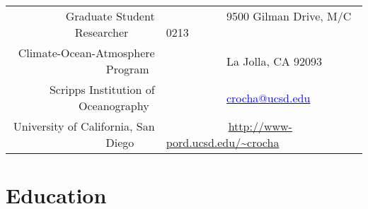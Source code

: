 \documentclass[pagestart=firstchapter]{article}
\begin{document}
\pagestyle{empty} %



\par{\bigskip\par} %

\begin{center}
    \begin{tabular}{rl}
        Graduate Student Researcher ~~~~ &  ~~~~~~~~~~ 9500 Gilman Drive, M/C 0213 \\ 
        Climate-Ocean-Atmosphere Program~  &  ~~~~~~~~~~ La Jolla, CA 92093 \\
       Scripps Institution of Oceanography~    & ~~~~~~~~~~ \href{mailto:crocha@ucsd.edu}{\textcolor{blue}{crocha@ucsd.edu}}\\
    University of California, San Diego ~~~& ~~~~~~~~~~~\url{http://www-pord.ucsd.edu/~crocha}\\
    \end{tabular}
\end{center}






\section*{Education}
\end{document}

